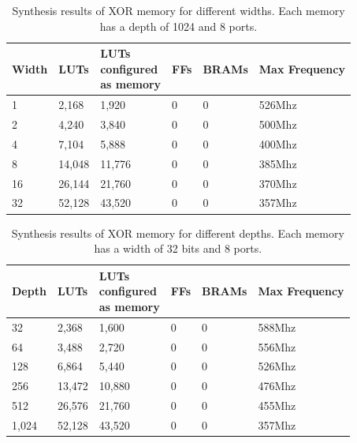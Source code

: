 \documentclass[sigconf,nonacm]{acmart}
\begin{document}
\begin{table}
  \caption{Synthesis results of XOR memory for different widths. Each memory has a depth of 1024 and 8 ports.}
  \label{tab:syn_xor_width}
  \begin{tabular}{llllll}
    \toprule
    Width & LUTs & \thead{LUTs\\ configured\\ as memory} & FFs & BRAMs & Max Frequency\\
    \midrule
    1 & 2,168 & 1,920 & 0 & 0 & 526Mhz\\
    2 & 4,240 & 3,840 & 0 & 0 & 500Mhz\\
    4 & 7,104 & 5,888 & 0 & 0 & 400Mhz\\
    8 & 14,048 & 11,776 & 0 & 0 & 385Mhz\\
    16 & 26,144 & 21,760 & 0 & 0 & 370Mhz\\
    32 & 52,128 & 43,520 & 0 & 0 & 357Mhz\\
    \bottomrule
  \end{tabular}
\end{table}

\begin{table}
  \caption{Synthesis results of XOR memory for different depths. Each memory has a width of 32 bits and 8 ports.}
  \label{tab:syn_xor_depth}
  \begin{tabular}{llllll}
    \toprule
    Depth & LUTs & \thead{LUTs\\ configured\\ as memory} & FFs & BRAMs & Max Frequency\\
    \midrule
    32 & 2,368 & 1,600 & 0 & 0 & 588Mhz\\
    64 & 3,488 & 2,720 & 0 & 0 & 556Mhz\\
    128 & 6,864 & 5,440 & 0 & 0 & 526Mhz\\
    256 & 13,472 & 10,880 & 0 & 0 & 476Mhz\\
    512 & 26,576 & 21,760 & 0 & 0 & 455Mhz\\
    1,024 & 52,128 & 43,520 & 0 & 0 & 357Mhz\\
    \bottomrule
  \end{tabular}
\end{table}
\end{document}
